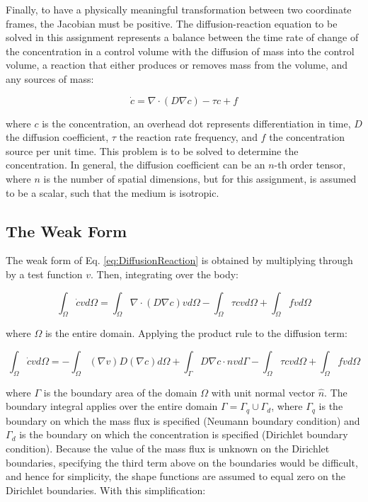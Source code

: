 \documentclass[10pt]{article}
\begin{document}
Finally, to have a physically meaningful transformation between two coordinate frames, the Jacobian must be positive. The diffusion-reaction equation to be solved in this assignment represents a balance between the time rate of change of the concentration in a control volume with the diffusion of mass into the control volume, a reaction that either produces or removes mass from the volume, and any sources of mass:

\begin{equation}
\label{eq:DiffusionReaction}
\dot{c}=\nabla\cdot(D\nabla c)-\tau c+f
\end{equation}

where \(c\) is the concentration, an overhead dot represents differentiation in time, \(D\) the diffusion coefficient, \(\tau\) the reaction rate frequency, and \(f\) the concentration source per unit time. This problem is to be solved to determine the concentration. In general, the diffusion coefficient can be an \(n\)-th order tensor, where \(n\) is the number of spatial dimensions, but for this assignment, is assumed to be a scalar, such that the medium is isotropic.

\subsection{The Weak Form}

The weak form of Eq. \eqref{eq:DiffusionReaction} is obtained by multiplying through by a test function \(v\). Then, integrating over the body:

\begin{equation}
\label{eq:StrongForm2}
\int_{\Omega}\dot{c}vd\Omega=\int_{\Omega}\nabla\cdot(D\nabla c)vd\Omega-\int_{\Omega}\tau cvd\Omega+\int_{\Omega}fvd\Omega
\end{equation}

where \(\Omega\) is the entire domain. Applying the product rule to the diffusion term:

\begin{equation}
\int_{\Omega}\dot{c}vd\Omega=-\int_{\Omega}(\nabla v)D(\nabla c)d\Omega+\int_{\Gamma}D\nabla c\cdot\hat{n}vd\Gamma-\int_{\Omega}\tau cvd\Omega+\int_{\Omega}fvd\Omega
\end{equation}

where \(\Gamma\) is the boundary area of the domain \(\Omega\) with unit normal vector \(\hat{n}\). The boundary integral applies over the entire domain \(\Gamma=\Gamma_q\cup\Gamma_d\), where \(\Gamma_q\) is the boundary on which the mass flux is specified (Neumann boundary condition) and \(\Gamma_d\) is the boundary on which the concentration is specified (Dirichlet boundary condition). Because the value of the mass flux is unknown on the Dirichlet boundaries, specifying the third term above on the boundaries would be difficult, and hence for simplicity, the shape functions are assumed to equal zero on the Dirichlet boundaries. With this simplification:
\end{document}
